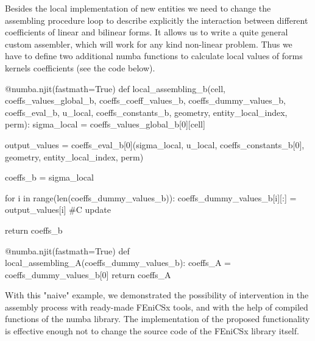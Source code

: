 \documentclass[12pt]{article}
\begin{document}
Besides the local implementation of new entities we need to change the assembling procedure loop to describe explicitly the interaction between different coefficients of linear and bilinear forms. It allows us to write a quite general custom assembler, which will work for any kind non-linear problem. Thus we have to define two additional numba functions to calculate local values of forms kernels coefficients (see the code below).

\begin{pythoncode}
    @numba.njit(fastmath=True)
    def local_assembling_b(cell, coeffs_values_global_b, coeffs_coeff_values_b, coeffs_dummy_values_b, coeffs_eval_b, 
                           u_local, coeffs_constants_b, geometry, entity_local_index, perm):
        sigma_local = coeffs_values_global_b[0][cell]
        
        output_values = coeffs_eval_b[0](sigma_local, 
                                         u_local, 
                                         coeffs_constants_b[0], 
                                         geometry, entity_local_index, perm)
    
        coeffs_b = sigma_local
    
        for i in range(len(coeffs_dummy_values_b)):
            coeffs_dummy_values_b[i][:] = output_values[i] #C update
    
        return coeffs_b
    
    @numba.njit(fastmath=True)
    def local_assembling_A(coeffs_dummy_values_b):
        coeffs_A = coeffs_dummy_values_b[0]
        return coeffs_A
\end{pythoncode}

With this "naive" example, we demonstrated the possibility of intervention in the assembly process with ready-made FEniCSx tools, and with the help of compiled functions of the numba library. The implementation of the proposed functionality is effective enough not to change the source code of the FEniCSx library itself.
\end{document}
